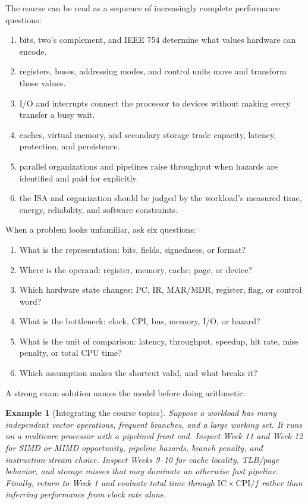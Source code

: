 \documentclass[11pt]{article}
\newtheorem{example}{Example}[section]
\begin{document}
The course can be read as a sequence of increasingly complete performance
questions:
\begin{enumerate}
  \item {} bits, two's complement, and IEEE 754 determine
        what values hardware can encode.
  \item {} registers, buses, addressing modes, and control units
        move and transform those values.
  \item {} I/O and interrupts connect the processor to
        devices without making every transfer a busy wait.
  \item {} caches, virtual memory, and secondary storage trade
        capacity, latency, protection, and persistence.
  \item {} parallel organizations and pipelines raise throughput
        when hazards are identified and paid for explicitly.
  \item {} the ISA and organization should be judged by the
        workload's measured time, energy, reliability, and software constraints.
\end{enumerate}

When a problem looks unfamiliar, ask six questions:
\begin{enumerate}
  \item What is the representation: bits, fields, signedness, or format?
  \item Where is the operand: register, memory, cache, page, or device?
  \item Which hardware state changes: PC, IR, MAR/MDR, register, flag, or
        control word?
  \item What is the bottleneck: clock, CPI, bus, memory, I/O, or hazard?
  \item What is the unit of comparison: latency, throughput, speedup, hit
        rate, miss penalty, or total CPU time?
  \item Which assumption makes the shortcut valid, and what breaks it?
\end{enumerate}
A strong exam solution names the model before doing arithmetic.

\begin{example}[Integrating the course topics]
Suppose a workload has many independent vector operations, frequent branches,
and a large working set. It runs on a multicore processor with a pipelined
front end. Inspect Week 11 and Week 12 for SIMD or MIMD opportunity, pipeline
hazards, branch penalty, and instruction-stream choice. Inspect Weeks 9--10
for cache locality, TLB/page behavior, and storage misses that may dominate an
otherwise fast pipeline. Finally, return to Week 1 and evaluate total time
through $\mathrm{IC}\times\mathrm{CPI}/f$ rather than inferring performance from
clock rate alone.
\end{example}
\end{document}
